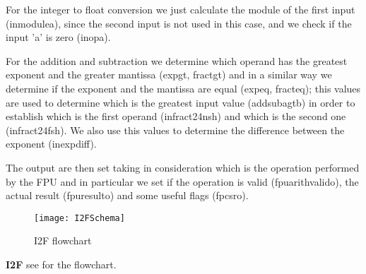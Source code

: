 For the integer to float conversion we just calculate the module of the first input (in\textunderscore module\textunderscore a), since the second input is not used in this case, and we check if the input 'a' is zero (in\textunderscore opa).

For the addition and subtraction we determine which operand has the greatest exponent and the greater mantissa (exp\textunderscore gt, fract\textunderscore gt) and in a similar way we determine if the exponent and the mantissa are equal (exp\textunderscore eq, fract\textunderscore eq); this values are used to determine which is the greatest input value (addsub\textunderscore agtb) in order to establish which is the first operand (in\textunderscore fract24\textunderscore nsh) and which is the second one (in\textunderscore fract24\textunderscore fsh). We also use this values to determine the difference between the exponent (in\textunderscore exp\textunderscore diff).

The output are then set taking in consideration which is the operation performed by the FPU and in particular we set if the operation is valid (fpu\textunderscore arith\textunderscore valid\textunderscore o), the actual result (fpu\textunderscore result\textunderscore o) and some useful flags (fpcsr\textunderscore o).
\newline

\begin{figure}
\centering\texttt{[image: I2FSchema]}
\caption{I2F flowchart}	
\label{fig:i2f_schema}
\end{figure}

\textbf{I2F} see
 for the flowchart.
\newline

